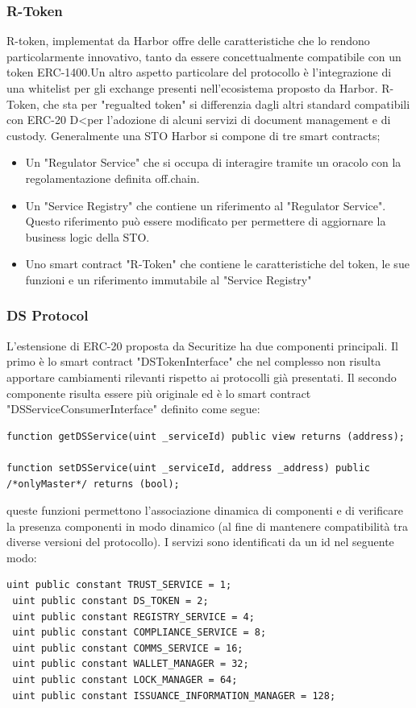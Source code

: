 \subsubsection{R-Token}
R-token, implementat da Harbor offre delle caratteristiche che lo rendono particolarmente innovativo, tanto da essere concettualmente compatibile con un token ERC-1400.Un altro aspetto particolare del protocollo è l'integrazione di una whitelist per gli exchange presenti nell'ecosistema proposto da Harbor. 
R-Token, che sta per "regualted token" si differenzia dagli altri standard compatibili con ERC-20 D<per l'adozione di alcuni servizi di document management e di custody. 
Generalmente una STO Harbor si compone di tre smart contracts;
\begin{itemize}
    \item Un "Regulator Service" che si occupa di interagire tramite un oracolo con la regolamentazione definita off.chain. 
    \item Un "Service Registry" che contiene un riferimento al "Regulator Service". Questo riferimento può essere modificato per permettere di aggiornare la business logic della STO. 
    \item Uno smart contract "R-Token" che contiene le caratteristiche del token, le sue funzioni e un riferimento immutabile al "Service Registry"
\end{itemize}
\subsubsection{DS Protocol}
L'estensione di ERC-20 proposta da Securitize ha due componenti principali. Il primo è lo smart contract "DSTokenInterface" che nel complesso non risulta apportare cambiamenti rilevanti rispetto ai protocolli già presentati. Il secondo componente risulta essere più originale ed è lo smart contract "DSServiceConsumerInterface" definito come segue:
\begin{lstlisting}[language=Solidity,numbers=none]
function getDSService(uint _serviceId) public view returns (address);

function setDSService(uint _serviceId, address _address) public /*onlyMaster*/ returns (bool);
\end{lstlisting}
queste funzioni permettono l'associazione dinamica di componenti e di verificare la presenza componenti  in modo dinamico (al fine di mantenere compatibilità tra diverse versioni del protocollo). I servizi sono identificati da un id nel seguente modo:
\begin{lstlisting}[language=Solidity,numbers=none]
 uint public constant TRUST_SERVICE = 1;
 uint public constant DS_TOKEN = 2;
 uint public constant REGISTRY_SERVICE = 4;
 uint public constant COMPLIANCE_SERVICE = 8;
 uint public constant COMMS_SERVICE = 16;
 uint public constant WALLET_MANAGER = 32;
 uint public constant LOCK_MANAGER = 64;
 uint public constant ISSUANCE_INFORMATION_MANAGER = 128;
 \end{lstlisting}
